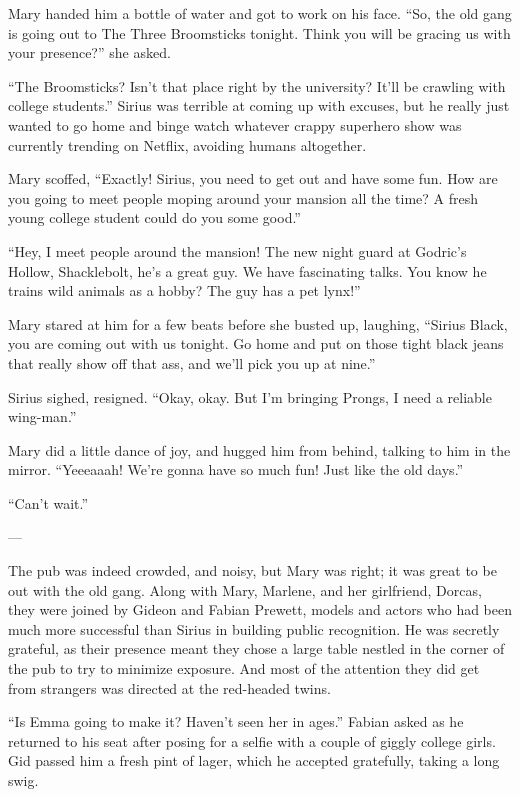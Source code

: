 \documentclass[12pt,twoside,openright]{memoir}
\begin{document}
Mary handed him a bottle of water and got to work on his face. ``So, the old gang is going out to The Three Broomsticks tonight. Think you will be gracing us with your presence?'' she asked.

``The Broomsticks? Isn't that place right by the university? It'll be crawling with college students.'' Sirius was terrible at coming up with excuses, but he really just wanted to go home and binge watch whatever crappy superhero show was currently trending on Netflix, avoiding humans altogether. 

Mary scoffed, ``Exactly! Sirius, you need to get out and have some fun. How are you going to meet people moping around your mansion all the time? A fresh young college student could do you some good.'' 

``Hey, I meet people around the mansion! The new night guard at Godric's Hollow, Shacklebolt, he's a great guy. We have fascinating talks. You know he trains wild animals as a hobby? The guy has a pet lynx!'' 

Mary stared at him for a few beats before she busted up, laughing, ``Sirius Black, you are coming out with us tonight. Go home and put on those tight black jeans that really show off that ass, and we'll pick you up at nine.'' 

Sirius sighed, resigned. ``Okay, okay. But I'm bringing Prongs, I need a reliable wing-man.'' 

Mary did a little dance of joy, and hugged him from behind, talking to him in the mirror. ``Yeeeaaah! We're gonna have so much fun! Just like the old days.'' 

``Can't wait.'' 

---

The pub was indeed crowded, and noisy, but Mary was right; it was great to be out with the old gang. Along with Mary, Marlene, and her girlfriend, Dorcas, they were joined by Gideon and Fabian Prewett, models and actors who had been much more successful than Sirius in building public recognition. He was secretly grateful, as their presence meant they chose a large table nestled in the corner of the pub to try to minimize exposure. And most of the attention they did get from strangers was directed at the red-headed twins. 

``Is Emma going to make it? Haven't seen her in ages.'' Fabian asked as he returned to his seat after posing for a selfie with a couple of giggly college girls. Gid passed him a fresh pint of lager, which he accepted gratefully, taking a long swig. 
\end{document}
